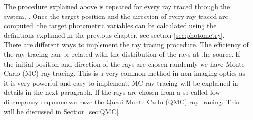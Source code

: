 The procedure explained above is repeated for every ray traced through the system, \cite{Gross2005Handbook}. 
Once the target position and the direction of every ray traced are computed, the target photometric variables can be calculated using the definitions explained in the previous chapter, see section \ref{sec:photometry}.\\ \indent
There are different ways to implement the ray tracing procedure. The efficiency of the ray tracing can be related with the distribution of the rays at the source. 
If the initial position and direction of the rays are chosen randomly we have Monte Carlo (MC) ray tracing. 
This is a very common method in non-imaging optics as it is very powerful and easy to implement. MC ray tracing will be explained in details in the next paragraph.
If the rays are chosen from a so-called low discrepancy sequence we have the Quasi-Monte Carlo (QMC) ray tracing.
This will be discussed in Section \ref{sec:QMC}.
